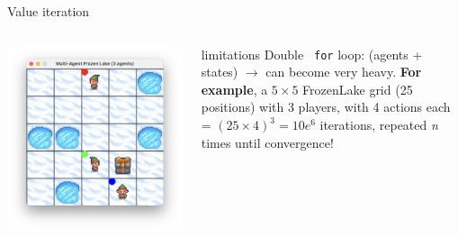 \documentclass[aspectratio=169,xcolor=dvipsnames]{beamer}
\begin{document}
\begin{frame}{Value iteration}
    \begin{columns} 
        \begin{column}{0.4\textwidth}
            \includegraphics[scale=0.2]{images/5x5-ma.png}
        \end{column}
        \hspace{-50pt}
        \begin{column}{0.6\textwidth}
            \vspace{-20pt}
            \begin{alertblock}{limitations}
                Double \texttt{ for} loop: (agents + states) $\to$ can become very heavy.  
                \textbf{For example}, a $5\times5$ FrozenLake grid (25 positions) with 3 players, with 4 actions each = $(25 \times 4)^3 = 10e^6$ iterations, repeated \textit{n} times until convergence!
            \end{alertblock}
        \end{column}
    \end{columns}
\end{frame}

\end{document}
